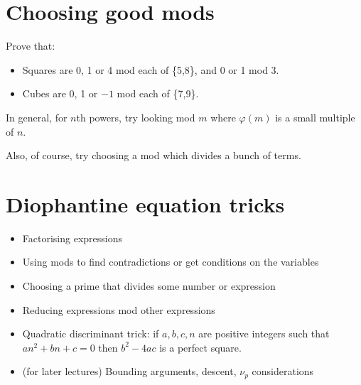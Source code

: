 \documentclass{article}
\begin{document}
\section{Choosing good mods}
  Prove that:
  \begin{itemize}
    \item Squares are 0, 1 or 4 mod each of \{5,8\}, and 0 or 1 mod 3.
    \item Cubes are 0, 1 or $-1$ mod each of \{7,9\}.
  \end{itemize}
  In general, for $n$th powers, try looking mod $m$ where $\varphi(m)$ is a
  small multiple of $n$.

  Also, of course, try choosing a mod which divides a bunch of terms.
\section{Diophantine equation tricks}
  \begin{itemize}
    \item Factorising expressions
    \item Using mods to find contradictions or get conditions on the variables
    \item Choosing a prime that divides some number or expression
    \item Reducing expressions mod other expressions
    \item Quadratic discriminant trick: if $a,b,c,n$ are positive integers such
      that $an^2+bn+c=0$ then $b^2-4ac$ is a perfect square.
    \item (for later lectures) Bounding arguments, descent, $\nu_p$
      considerations
  \end{itemize}
\end{document}
